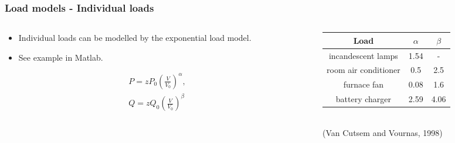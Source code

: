 \documentclass{beamer}
\begin{document}
\begin{frame}
  \frametitle{Load models - Individual loads}
  \begin{columns}
    \begin{column}{0.5\textwidth}
  \begin{itemize}
  \item Individual loads can be modelled by the exponential load model.
  \item See example in Matlab.
  \end{itemize}  
  \begin{align*}
    \label{eq:11}
P = zP_0 \left( \frac{V}{V_0} \right)^\alpha,\\
Q = z Q_0 \left( \frac{V}{V_0} \right)^\beta
  \end{align*}
    \end{column}
    \begin{column}{0.5\textwidth}
\begin{tabular}{ccc}
\toprule
Load & $\alpha$ & $\beta$ \\
\midrule
incandescent lamps & 1.54 & - \\
room air conditioner & 0.5 & 2.5 \\
furnace fan & 0.08 & 1.6 \\
battery charger & 2.59 & 4.06 \\
\bottomrule
\end{tabular}\\
(Van Cutsem and Vournas, 1998)\\      
    \end{column}
  \end{columns}

\end{frame}
\end{document}

